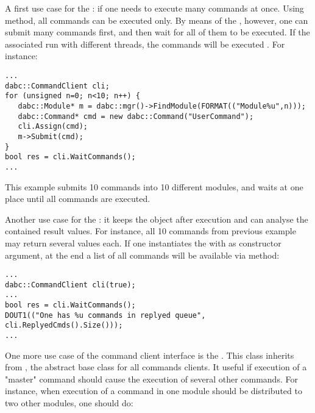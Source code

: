 A first use case for the : if one needs to execute many commands at once.
Using  method, all commands can be  executed  only.
By means of the , however, 
one can  submit many commands first, and then wait for all
of them to be executed.  If the associated  run with 
different threads, the commands will be executed . For instance:

\begin{small}
\begin{verbatim}
...
dabc::CommandClient cli;
for (unsigned n=0; n<10; n++) {
   dabc::Module* m = dabc::mgr()->FindModule(FORMAT(("Module%u",n)));
   dabc::Command* cmd = new dabc::Command("UserCommand");
   cli.Assign(cmd);
   m->Submit(cmd);
}
bool res = cli.WaitCommands();
...
\end{verbatim}     
\end{small}
  
This example submits 10 commands into 10 different modules, 
and waits at one place until all commands are executed.

Another use case for the : 
it keeps the  object after execution 
and can analyse the contained result values. 
For instance, all 10 commands from previous example may 
return several values each. If one instantiates 
the  with  as constructor argument,
at the end a list of all commands will be available 
via  method: 
\begin{small}
\begin{verbatim}
...
dabc::CommandClient cli(true);
...
bool res = cli.WaitCommands();
DOUT1(("One has %u commands in replyed queue", cli.ReplyedCmds().Size()));
...
\end{verbatim}     
\end{small}


One more use case of the command client interface is the . 
This class inherits from ,
the abstract base class for all commands clients. 
It useful if execution of a "master" command should cause the execution of several
other commands. For instance, when execution of a command 
in one module should be distributed to two other modules, one should do:


